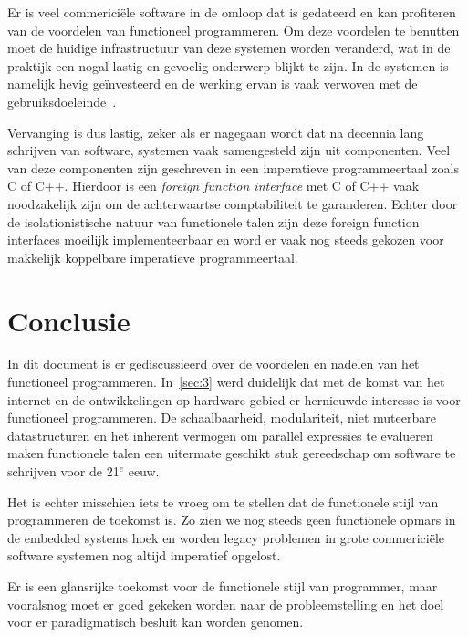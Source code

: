 \documentclass[twoside,twocolumn]{article}
\begin{document}
Er is veel commerici\"ele software in de omloop dat is gedateerd en kan
profiteren van de voordelen van functioneel programmeren. Om deze voordelen te
benutten moet de huidige infrastructuur van deze systemen worden veranderd, wat
in de praktijk een nogal lastig en gevoelig onderwerp blijkt te zijn. In de
systemen is namelijk hevig ge\"investeerd en de werking ervan is vaak verwoven
met de gebruiksdoeleinde~\cite{src18,src25}.

Vervanging is dus lastig, zeker als er nagegaan wordt dat na decennia lang
schrijven van software, systemen vaak samengesteld zijn uit componenten. Veel
van deze componenten zijn geschreven in een imperatieve programmeertaal zoals C
of C++. Hierdoor is een \textit{foreign function interface} met C of C++ vaak
noodzakelijk zijn om de achterwaartse comptabiliteit te garanderen\cite{src19}.
Echter door de isolationistische natuur van functionele talen zijn deze foreign
function interfaces moeilijk implementeerbaar en word er vaak nog steeds
gekozen voor makkelijk koppelbare imperatieve programmeertaal.

\section{Conclusie}
\label{sec:5}

In dit document is er gediscussieerd over de voordelen en nadelen van het
functioneel programmeren. In~\cref{sec:3} werd duidelijk dat met de komst van
het internet en de ontwikkelingen op hardware gebied er hernieuwde interesse is
voor functioneel programmeren. De schaalbaarheid, modulariteit, niet muteerbare
datastructuren en het inherent vermogen om parallel expressies te evalueren
maken functionele talen een uitermate geschikt stuk gereedschap om software te
schrijven voor de 21$^e$ eeuw.

Het is echter misschien iets te vroeg om te stellen dat de functionele stijl
van programmeren de toekomst is. Zo zien we nog steeds geen functionele opmars
in de embedded systems hoek en worden legacy problemen in grote commerici\"ele
software systemen nog altijd imperatief opgelost.

Er is een glansrijke toekomst voor de functionele stijl van programmer, maar
vooralsnog moet er goed gekeken worden naar de probleemstelling en het doel
voor er paradigmatisch besluit kan worden genomen.

\end{document}
